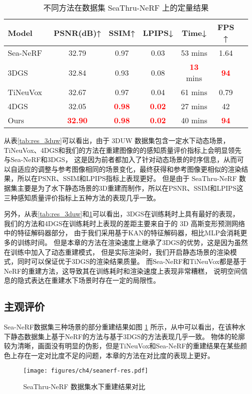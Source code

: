 \begin{table} [htbp]
    \small
    \centering
    \caption{不同方法在数据集 SeaThru-NeRF 上的定量结果}
    \setlength{\tabcolsep}{10pt}
    \begin{tabular}{lcccccc} 
    \toprule
    Model  & PSNR(dB)↑ & SSIM↑ & LPIPS↓ & Time↓ &  FPS ↑  \\ 
    \midrule  
    Sea-NeRF\cite{seathru} & 32.79 & 0.97 & 0.03 & 53 mins & 1.64\\
    3DGS~\cite{3DGS} &32.84 & 0.93 & 0.08&\textcolor{red}{\textbf{13}} mins  &\textcolor{red}{\textbf{94}}\\
    TiNeuVox~\cite{tineuvox}  & 32.67 & 0.97 &  0.04 & 61 mins & 0.79\\ 
    4DGS\cite{4DGS} & 32.05&\textcolor{red}{\textbf{0.98}} &\textcolor{red}{\textbf{0.02}}& 27 mins&42 \\
    Ours & \textcolor{red}{\textbf{32.90}} & \textcolor{red}{\textbf{0.98}} & \textcolor{red}{\textbf{0.02}} & 40 mins & \textcolor{red}{\textbf{94}}\\
    \bottomrule
    \end{tabular}  
    
    \label{tab:res_seanerf}
\end{table}

从表\ref{tab:res_3duw}可以看出，由于 3DUW 数据集包含一定水下动态场景，TiNeuVox\cite{tineuvox}、4DGS\cite{4DGS}和我们的方法在重建图像的的感知质量评价指标上会明显领先与Sea-NeRF\cite{seathru}和3DGS\cite{3DGS}，
这是因为前者都加入了针对动态场景的时序信息，从而可以自适应的调整与参考图像相同的场景变化，最终获得和参考图像更相似的渲染结果，所以在PSNR、SSIM和LPIPS指标上表现更好。
但是由于 SeaThru-NeRF 数据集主要是为了水下静态场景的3D重建而制作，所以在PSNR、SSIM和LPIPS这三种感知质量评价指标上五种方法的表现几乎一致。

另外，从表\ref{tab:res_3duw}和\ref{tab:res_seanerf}可以看出，3DGS\cite{3DGS}在训练耗时上具有最好的表现，
我们的方法和4DGS\cite{4DGS}在训练耗时上表现的差距主要来自于的 3D 高斯变形预测网络中的特征解码器部分，
由于我们采用基于KAN的特征解码器，相比MLP会消耗更多的训练时间。
但是本章的方法在渲染速度上继承了3DGS\cite{3DGS}的优势，这是因为虽然在训练中加入了动态重建模式，
但是实际渲染时，我们开启静态场景的渲染模式，同时可以保证优于3DGS的渲染结果质量。
而Sea-NeRF\cite{seathru}和TiNeuVox\cite{tineuvox}都是基于NeRF的重建方法，这导致其在训练耗时和渲染速度上表现非常糟糕，
说明空间信息的隐式表达在重建水下场景时存在一定的局限性。


\subsection{主观评价}
Sea-NeRF\cite{seathru}数据集三种场景的部分重建结果如图 \ref{img:res_seanerf} 所示，从中可以看出，在该种水下静态数据集上基于NeRF的方法与基于3DGS的方法表现几乎一致。
物体的轮廓较为清晰，画面没有明显的伪影，但是TiNeuVox\cite{tineuvox}和Sea-NeRF\cite{seathru}的重建结果在某些颜色上存在一定对比度不足的问题，本章的方法在对比度的表现上更好。
\begin{figure}[htbp]
    \centering
    \texttt{[image: figures/ch4/seanerf-res.pdf]}
    \caption{SeaThru-NeRF 数据集水下重建结果对比}
    \label{img:res_seanerf}
\end{figure}

